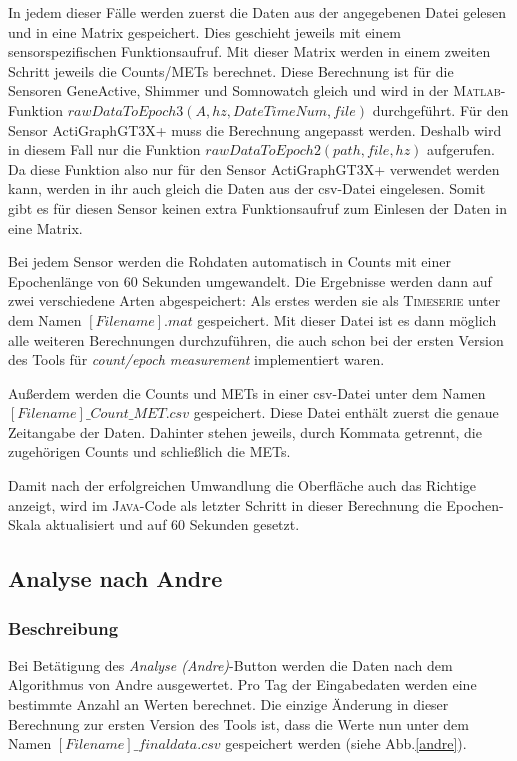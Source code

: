 \documentclass[onecolumn,german]{article}
\begin{document}
In jedem dieser Fälle werden zuerst die Daten aus der angegebenen Datei gelesen und in eine Matrix gespeichert. Dies geschieht jeweils mit einem sensorspezifischen Funktionsaufruf. Mit dieser Matrix werden in einem zweiten Schritt jeweils die Counts/METs berechnet. Diese Berechnung ist für die Sensoren GeneActive, Shimmer und Somnowatch gleich und wird in der \textsc{Matlab}-Funktion \textit{$rawDataToEpoch3(A,hz,DateTimeNum, file)$} durchgeführt. Für den Sensor ActiGraphGT3X+ muss die Berechnung angepasst werden. Deshalb wird in diesem Fall nur die Funktion \textit{$rawDataToEpoch2(path,file,hz)$} aufgerufen. Da diese Funktion also nur für den Sensor ActiGraphGT3X+ verwendet werden kann, werden in ihr auch gleich die Daten aus der csv-Datei eingelesen. Somit gibt es für diesen Sensor keinen extra Funktionsaufruf zum Einlesen der Daten in eine Matrix.\newline

Bei jedem Sensor werden die Rohdaten automatisch in Counts mit einer Epochenlänge von 60 Sekunden umgewandelt. Die Ergebnisse werden dann auf zwei verschiedene Arten abgespeichert: Als erstes werden sie als \textsc{Timeserie} unter dem Namen {$[Filename].mat$} gespeichert. Mit dieser Datei ist es dann möglich alle weiteren Berechnungen durchzuführen, die auch schon bei der ersten Version des Tools für \textit{count/epoch measurement} implementiert waren.\newline

Außerdem werden die Counts und METs in einer csv-Datei unter dem Namen {$[Filename]\_Count\_MET.csv$} gespeichert. Diese Datei enthält zuerst die genaue Zeitangabe der Daten. Dahinter stehen jeweils, durch Kommata getrennt, die zugehörigen Counts und schließlich die METs.\newline

Damit nach der erfolgreichen Umwandlung die Oberfläche auch das Richtige anzeigt, wird im \textsc{Java}-Code als letzter Schritt in dieser Berechnung die Epochen-Skala aktualisiert und auf 60 Sekunden gesetzt.

\subsection{Analyse nach Andre}
\subsubsection{Beschreibung}
Bei Betätigung des \textit{Analyse (Andre)}-Button werden die Daten nach dem Algorithmus von Andre ausgewertet. Pro Tag der Eingabedaten werden eine bestimmte Anzahl an Werten berechnet. Die einzige Änderung in dieser Berechnung zur ersten Version des Tools ist, dass die Werte nun unter dem Namen \textit{$[Filename]\_finaldata.csv$} gespeichert werden (siehe Abb.\ref{andre}).
\end{document}
